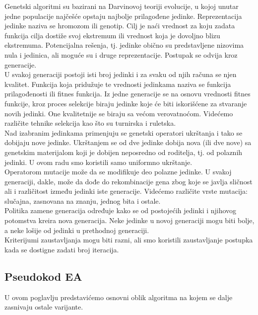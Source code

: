\documentclass{article}
\begin{document}
Genetski algoritmi \cite{vi_Janicic} su bazirani na Darvinovoj teoriji evolucije, u kojoj unutar jedne populacije najčešće opstaju najbolje prilagođene jedinke. Reprezentacija jedinke naziva se hromozom ili genotip. Cilj je naći vrednost za koju zadata funkcija cilja dostiže svoj ekstremum ili vrednost koja je dovoljno blizu ekstremuma. Potencijalna rešenja, tj. jedinke obično su predstavljene nizovima nula i jedinica, ali moguće su i druge reprezentacije. Postupak se odvija kroz generacije.\\

U svakoj generaciji postoji isti broj jedinki i za svaku od njih računa se njen kvalitet. Funkcija koja pridužuje te vrednosti jedinkama naziva se funkcija prilagođenosti ili fitnes funkcija. Iz jedne generacije se na osnovu vrednosti fitnes funkcije, kroz proces selekcije biraju jedinke koje će biti iskorišćene za stvaranje novih jedinki. One kvalitetnije se biraju sa većom verovatnoćom. Videćemo različite tehnike selekcija kao što su turnirska i ruletska. \\

Nad izabranim jedinkama primenjuju se genetski operatori ukrštanja i tako se dobijaju nove jedinke. Ukrštanjem se od dve jedinke dobija nova (ili dve nove) sa genetskim materijalom koji je dobijen neposredno od roditelja, tj. od polaznih jedinki. U ovom radu smo koristili samo uniformno ukrštanje. \\

Operatorom mutacije može da se modifikuje deo polazne jedinke. U svakoj generaciji, dakle, može da dođe do rekombinacije gena zbog koje se javlja sličnost ali i različitost između jedinki iste generacije. Videćemo različite vrste mutacija: slučajna, zasnovana na znanju, jednog bita i ostale. \\

Politika zamene generacija određuje kako se od postojećih jedinki i njihovog potomstva kreira nova generacija. Neke jedinke u novoj generaciji mogu biti bolje, a neke lošije od jedinki u prethodnoj generaciji. \\

Kriterijumi zaustavljanja mogu biti razni, ali smo koristili zaustavljanje postupka kada se dostigne zadati broj iteracija.

\subsection{Pseudokod EA}
\label{sec:ea_preudokod}

U ovom poglavlju predstavićemo osnovni oblik algoritma na kojem se dalje zasnivaju ostale varijante. 
\end{document}
